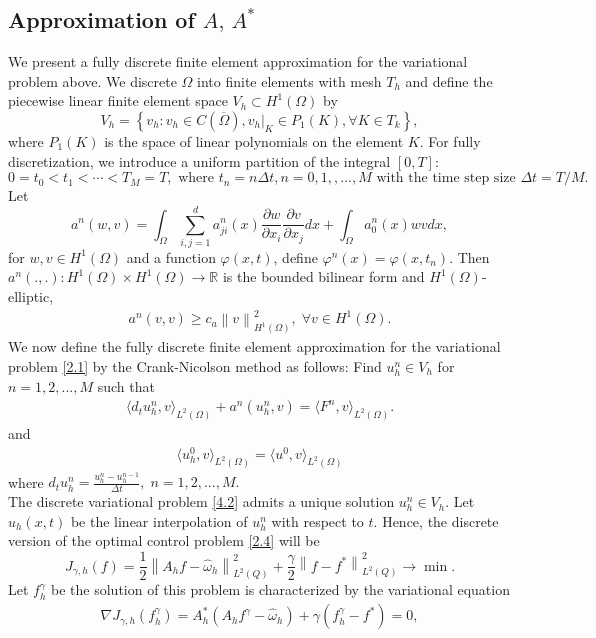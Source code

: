 \documentclass[]{article}
\begin{document}
\subsection{Approximation of $A,\, A^*$}
We present a fully discrete finite element approximation for the variational problem above. We discrete $\Omega$ into finite elements with mesh $T_h$ and define the piecewise linear finite element space $V_h \subset H^1(\Omega)$ by
$$V_h=\left\{v_h:v_h\in C(\overline{\Omega}), v_h|_K\in P_1(K), \forall K\in T_k\right\},$$
where $P_1(K)$ is the space of linear polynomials on the element $K$. For fully discretization, we introduce a uniform partition of the integral $[0, T]:$
$$0=t_0<t_1<\cdots<T_M=T , \text{ where } t_n=n\Delta t, n=0, 1, , ..., M \text{ with the time step size } \Delta t = T/M.$$
Let 
$$a^n(w, v)=\int_{\Omega}\sum_{i, j=1}^{d}a^n_{ji}(x)\frac{\partial w}{\partial x_i}\frac{\partial v}{\partial x_j}dx+\int_{\Omega}a_0^n(x)wvdx,$$
for $w, v\in H^1(\Omega)$ and a function $\varphi(x, t)$, define $\varphi^n(x)=\varphi(x, t_n)$. Then $a^n(., .): H^1(\Omega)\times H^1(\Omega)\to \mathbb{R}$ is the bounded bilinear form and $H^1(\Omega)$-elliptic,
\begin{align}\label{elliptic}
	a^n(v, v)\geq c_a\left\|v\right\|_{H^1(\Omega)}^2, \; \forall v\in H^1(\Omega).
\end{align}
We now define the fully discrete finite element approximation for the variational problem \eqref{2.1} by the Crank-Nicolson method as follows: Find $u^n_h\in V_h$ for $n=1, 2, ..., M$ such that
\begin{align}\label{4.2}
	\langle d_tu^n_h, v \rangle_{L^2(\Omega)}+a^n(u^n_h, v)=\langle F^n, v \rangle_{L^2(\Omega)}.
\end{align}
and
\begin{align}
	\langle u^0_h, v \rangle_{L^2(\Omega)}=\langle u^0, v \rangle_{L^2(\Omega)}
\end{align}
where $d_tu^n_h=\frac{u^n_h-u^{n-1}_h}{\Delta t}, \; n=1, 2, ..., M.$
\\
The discrete variational problem \eqref{4.2} admits a unique solution $u^n_h\in V_h$. Let $u_h(x, t)$ be the linear interpolation of $u_h^n$ with respect to $t$. Hence, the discrete version of the optimal control problem \eqref{2.4} will be
$$J_{\gamma, h}(f)=\frac{1}{2}\left\|A_hf-\hat{\omega}_h\right\|^2_{L^2(Q)}+\frac{\gamma}{2}\left\|f-f^*\right\|^2_{L^2(Q)}\to \min.$$
Let $f^\gamma_h$ be the solution of this problem is characterized by the variational equation
\begin{align}\label{3.3}
	\nabla J_{\gamma, h}(f^\gamma_h)= A_h^*(A_hf^\gamma-\hat{\omega}_h)+\gamma(f^\gamma_h-f^*)=0,
\end{align}
\end{document}
